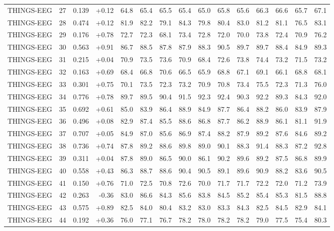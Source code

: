 \begin{longtable}{@{}llrrrrrrrrrrrrr@{}}
THINGS-EEG & 27 & 0.139 & +0.12 & 64.8 & 65.4 & 65.5 & 65.4 & 65.0 & 65.8 & 65.6 & 66.3 & 66.6 & 65.7 & 67.1 \\
THINGS-EEG & 28 & 0.474 & +0.12 & 81.9 & 82.2 & 79.1 & 84.3 & 79.8 & 80.4 & 83.0 & 81.2 & 81.1 & 76.5 & 83.1 \\
THINGS-EEG & 29 & 0.176 & +0.78 & 72.7 & 72.3 & 68.1 & 73.4 & 72.8 & 72.0 & 70.0 & 73.8 & 72.4 & 70.9 & 76.2 \\
THINGS-EEG & 30 & 0.563 & +0.91 & 86.7 & 88.5 & 87.8 & 87.9 & 88.3 & 90.5 & 89.7 & 89.7 & 88.4 & 84.9 & 89.3 \\
THINGS-EEG & 31 & 0.215 & +0.04 & 70.9 & 73.5 & 73.6 & 70.9 & 68.4 & 72.6 & 73.8 & 74.4 & 73.2 & 71.5 & 73.2 \\
THINGS-EEG & 32 & 0.163 & +0.69 & 68.4 & 66.8 & 70.6 & 66.5 & 65.9 & 68.8 & 67.1 & 69.1 & 66.1 & 68.8 & 68.1 \\
THINGS-EEG & 33 & 0.301 & +0.75 & 70.1 & 73.5 & 72.3 & 73.2 & 70.9 & 70.8 & 73.4 & 75.5 & 72.3 & 71.3 & 76.0 \\
THINGS-EEG & 34 & 0.776 & +0.78 & 89.7 & 89.5 & 90.4 & 91.5 & 92.3 & 92.4 & 90.3 & 92.2 & 89.3 & 84.3 & 92.0 \\
THINGS-EEG & 35 & 0.692 & +0.61 & 85.0 & 83.9 & 86.4 & 88.9 & 84.9 & 87.7 & 86.4 & 88.2 & 86.0 & 83.9 & 87.9 \\
THINGS-EEG & 36 & 0.496 & +0.08 & 82.9 & 87.4 & 85.5 & 88.6 & 86.8 & 87.7 & 86.2 & 88.9 & 86.1 & 81.1 & 91.9 \\
THINGS-EEG & 37 & 0.707 & +0.05 & 84.9 & 87.0 & 85.6 & 86.9 & 87.4 & 88.2 & 87.9 & 89.2 & 87.6 & 84.6 & 89.2 \\
THINGS-EEG & 38 & 0.736 & +0.74 & 87.8 & 89.2 & 88.6 & 89.8 & 89.0 & 90.1 & 88.3 & 91.4 & 88.3 & 87.2 & 92.8 \\
THINGS-EEG & 39 & 0.311 & +0.04 & 87.8 & 89.0 & 86.5 & 90.0 & 86.1 & 90.2 & 89.6 & 89.2 & 87.5 & 86.8 & 89.9 \\
THINGS-EEG & 40 & 0.558 & +0.43 & 86.3 & 88.7 & 88.6 & 90.4 & 90.5 & 89.1 & 89.6 & 90.9 & 88.2 & 83.6 & 90.5 \\
THINGS-EEG & 41 & 0.150 & +0.76 & 71.0 & 72.5 & 70.8 & 72.6 & 70.0 & 71.7 & 71.7 & 72.2 & 72.0 & 71.2 & 73.9 \\
THINGS-EEG & 42 & 0.263 & -0.36 & 83.0 & 86.6 & 84.3 & 85.6 & 83.8 & 84.5 & 85.2 & 85.4 & 85.3 & 81.5 & 88.8 \\
THINGS-EEG & 43 & 0.575 & +0.89 & 82.5 & 84.0 & 80.4 & 83.2 & 83.0 & 83.3 & 84.3 & 82.5 & 84.5 & 82.9 & 84.1 \\
THINGS-EEG & 44 & 0.192 & +0.36 & 76.0 & 77.1 & 76.7 & 78.2 & 78.0 & 78.2 & 78.2 & 79.0 & 77.5 & 75.4 & 80.3 \\

\end{longtable}
